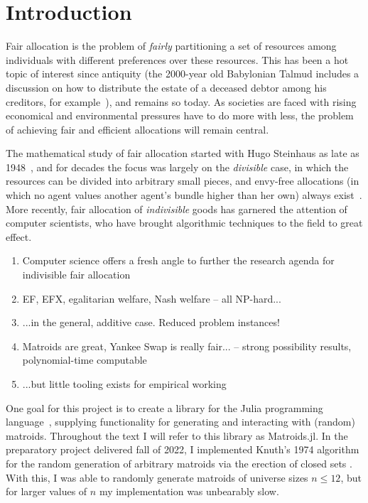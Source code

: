 \chapter{Introduction}

Fair allocation is the problem of \textit{fairly} partitioning a set of resources among individuals with different preferences over these resources. This has been a hot topic of interest since antiquity (the 2000-year old Babylonian Talmud includes a discussion on how to distribute the estate of a deceased debtor among his creditors, for example~\cite{aumann-1985}), and remains so today. As societies are faced with rising economical and environmental pressures have to do more with less, the problem of achieving fair and efficient allocations will remain central. 

The mathematical study of fair allocation started with Hugo Steinhaus as late as 1948~\cite{steinhaus-1948}, and for decades the focus was largely on the \textit{divisible} case, in which the resources can be divided into arbitrary small pieces, and envy-free allocations (in which no agent values another agent's bundle higher than her own) always exist~\cite{amanatidis2022fair}. More recently, fair allocation of \textit{indivisible} goods has garnered the attention of computer scientists, who have brought algorithmic techniques to the field to great effect. 

\begin{enumerate}
  \item Computer science offers a fresh angle to further the research agenda for indivisible fair allocation
  \item EF, EFX, egalitarian welfare, Nash welfare -- all NP-hard...
  \item ...in the general, additive case. Reduced problem instances!
  \item Matroids are great, Yankee Swap is really fair...
  \subitem -- strong possibility results, polynomial-time computable
  \item ...but little tooling exists for empirical working
\end{enumerate}

One goal for this project is to create a library for the Julia programming language~\cite{bezanson2017julia}, supplying functionality for generating and interacting with (random) matroids. Throughout the text I will refer to this library as Matroids.jl. In the preparatory project delivered fall of 2022, I implemented Knuth's 1974 algorithm for the random generation of arbitrary matroids via the erection of closed sets \cite{knuth-1975}. With this, I was able to randomly generate matroids of universe sizes $n \leq 12$, but for larger values of $n$ my implementation was unbearably slow. 